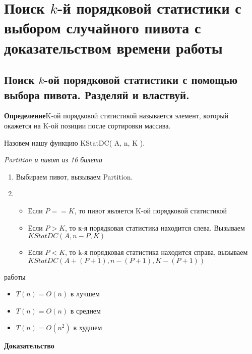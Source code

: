 \setcounter{section}{16}
\section{Поиск $k$-й порядковой статистики с выбором случайного пивота с доказательством времени работы}

\subsection*{Поиск $k$-ой порядковой статистики с помощью выбора пивота. Разделяй и властвуй.}

\noindent\textbf{Определение}{K-ой порядковой статистикой называется элемент, который окажется на K-ой позиции после сортировки массива.}

Назовем нашу функцию KStatDC( A, n, K ).

\textit{Partition и пивот из 16 билета}

\begin{enumerate}
    \item Выбираем пивот, вызываем Partition.
    \item \begin{itemize}
        \item Если $P == K$, то пивот является K-ой порядковой статистикой
        \item Если $P > K$, то к-я порядковая статистика находится слева. Вызываем $KStatDC(A, n-P, K)$ 
        \item Если $P < K$, то k-я порядковая статистика находится справа, вызываем $KStatDC(A + (P + 1), n - (P + 1), K - (P+1))$
    \end{itemize}
\end{enumerate}
 работы
\begin{itemize}
    \item $T(n) = O(n)$ в лучшем
    \item $T(n) = O(n)$ в среднем
    \item $T(n) = O(n^2)$ в худшем
\end{itemize}

\textbf{Доказательство}

